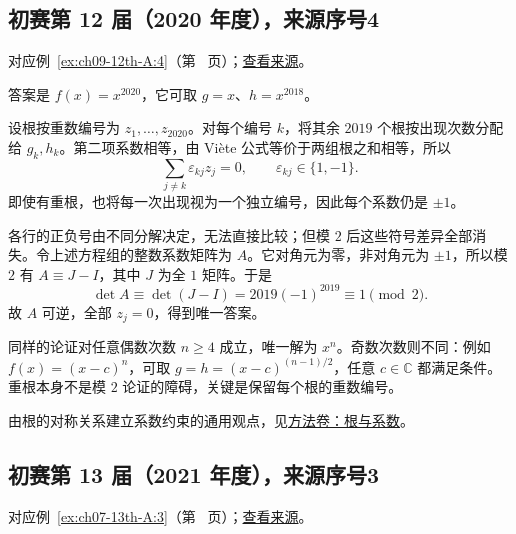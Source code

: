\documentclass[12pt,fontset=fandol]{ctexart}
\begin{document}
\subsection{初赛第 12 届（2020 年度），来源序号4}\label{ans:ch09-12th-A:4}\label{pr:ch09-12th-A:4}

对应例~\ref{ex:ch09-12th-A:4}（第~\pageref{ex:ch09-12th-A:4} 页）；\href{https://github.com/lzxcr/cmc-mathematics/blob/64916fa1fdbc3e444a652eca204d5669058ee321/src/problems/preliminary/12/04.md}{查看来源}。

\begin{solve}

答案是 $f(x)=x^{2020}$，它可取 $g=x$、$h=x^{2018}$。

设根按重数编号为 $z_1,\ldots,z_{2020}$。对每个编号 $k$，将其余 $2019$ 个根按出现次数分配给 $g_k,h_k$。第二项系数相等，由 Viète 公式等价于两组根之和相等，所以
\[
\sum_{j\neq k}\varepsilon_{kj}z_j=0,
\qquad \varepsilon_{kj}\in\{1,-1\}.
\]
即使有重根，也将每一次出现视为一个独立编号，因此每个系数仍是 $\pm1$。

各行的正负号由不同分解决定，无法直接比较；但模 $2$ 后这些符号差异全部消失。令上述方程组的整数系数矩阵为 $A$。它对角元为零，非对角元为 $\pm1$，所以模 $2$ 有 $A\equiv J-I$，其中 $J$ 为全 $1$ 矩阵。于是
\[
\det A\equiv\det(J-I)
=2019(-1)^{2019}\equiv1\pmod2.
\]
故 $A$ 可逆，全部 $z_j=0$，得到唯一答案。

\end{solve}

\begin{remark}[方法与条件]

同样的论证对任意偶数次数 $n\geq4$ 成立，唯一解为 $x^n$。奇数次数则不同：例如 $f(x)=(x-c)^n$，可取 $g=h=(x-c)^{(n-1)/2}$，任意 $c\in\mathbb C$ 都满足条件。重根本身不是模 $2$ 论证的障碍，关键是保留每个根的重数编号。

由根的对称关系建立系数约束的通用观点，见\hyperref[app:algebra-roots]{方法卷：根与系数}。

\end{remark}

\subsection{初赛第 13 届（2021 年度），来源序号3}\label{ans:ch07-13th-A:3}\label{pr:ch07-13th-A:3}

对应例~\ref{ex:ch07-13th-A:3}（第~\pageref{ex:ch07-13th-A:3} 页）；\href{https://github.com/lzxcr/cmc-mathematics/blob/64916fa1fdbc3e444a652eca204d5669058ee321/src/problems/preliminary/13/03.md}{查看来源}。
\end{document}
